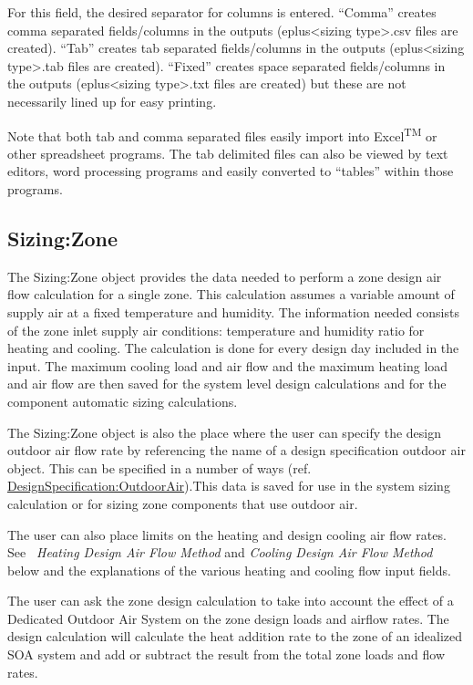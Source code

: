 For this field, the desired separator for columns is entered. ``Comma'' creates comma separated fields/columns in the outputs (eplus\textless{}sizing type\textgreater{}.csv files are created). ``Tab'' creates tab separated fields/columns in the outputs (eplus\textless{}sizing type\textgreater{}.tab files are created). ``Fixed'' creates space separated fields/columns in the outputs (eplus\textless{}sizing type\textgreater{}.txt files are created) but these are not necessarily lined up for easy printing.

Note that both tab and comma separated files easily import into Excel\textsuperscript{TM} or other spreadsheet programs. The tab delimited files can also be viewed by text editors, word processing programs and easily converted to ``tables'' within those programs.

\subsection{Sizing:Zone}\label{sizingzone}

The Sizing:Zone object provides the data needed to perform a zone design air flow calculation for a single zone. This calculation assumes a variable amount of supply air at a fixed temperature and humidity. The information needed consists of the zone inlet supply air conditions: temperature and humidity ratio for heating and cooling. The calculation is done for every design day included in the input. The maximum cooling load and air flow and the maximum heating load and air flow are then saved for the system level design calculations and for the component automatic sizing calculations.

The Sizing:Zone object is also the place where the user can specify the design outdoor air flow rate by referencing the name of a design specification outdoor air object. This can be specified in a number of ways (ref. \hyperref[designspecificationoutdoorair]{DesignSpecification:OutdoorAir}).This data is saved for use in the system sizing calculation or for sizing zone components that use outdoor air.

The user can also place limits on the heating and design cooling air flow rates. See \emph{~Heating Design Air Flow Method} and \emph{Cooling Design Air Flow Method} below and the explanations of the various heating and cooling flow input fields.

The user can ask the zone design calculation to take into account the effect of a Dedicated Outdoor Air System on the zone design loads and airflow rates. The design calculation will calculate the heat addition rate to the zone of an idealized SOA system and add or subtract the result from the total zone loads and flow rates.

